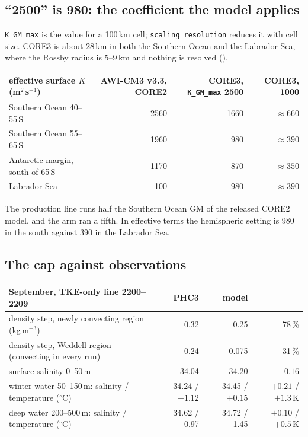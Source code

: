\documentclass[10pt]{article}
\begin{document}
\subsection{``2500'' is 980: the coefficient the model applies}\label{sub:r51keff}

\texttt{K\_GM\_max} is the value for a 100\,km cell; \texttt{scaling\_resolution} reduces it with
cell size. CORE3 is about 28\,km in both the Southern Ocean and the Labrador Sea, where the Rossby
radius is 5--9\,km and nothing is resolved ().

\begin{center}\small
\begin{tabular}{lrrr}
\toprule
effective surface $K$ (m$^2$\,s$^{-1}$) & AWI-CM3 v3.3, CORE2 & CORE3, \texttt{K\_GM\_max} 2500 & CORE3, 1000 \\
\midrule
Southern Ocean 40--55\,S & 2560 & 1660 & $\approx660$ \\
Southern Ocean 55--65\,S & 1960 & 980 & $\approx390$ \\
Antarctic margin, south of 65\,S & 1170 & 870 & $\approx350$ \\
Labrador Sea & 100 & 980 & $\approx390$ \\
\bottomrule
\end{tabular}
\end{center}

The production line runs half the Southern Ocean GM of the released CORE2 model, and the arm ran a
fifth. In effective terms the hemispheric setting is 980 in the south against 390 in the Labrador
Sea.

\subsection{The cap against observations}\label{sub:r51phc}

\begin{center}\small
\begin{tabular}{lrrr}
\toprule
September, TKE-only line 2200--2209 & PHC3 & model & \\
\midrule
density step, newly convecting region (kg\,m$^{-3}$) & 0.32 & 0.25 & 78\,\% \\
density step, Weddell region (convecting in every run) & 0.24 & 0.075 & 31\,\% \\
surface salinity 0--50\,m & 34.04 & 34.20 & $+0.16$ \\
winter water 50--150\,m: salinity / temperature ($^\circ$C) & 34.24 / $-1.12$ & 34.45 / $+0.15$ & $+0.21$ / $+1.3$\,K \\
deep water 200--500\,m: salinity / temperature ($^\circ$C) & 34.62 / 0.97 & 34.72 / 1.45 & $+0.10$ / $+0.5$\,K \\
\bottomrule
\end{tabular}
\end{center}
\end{document}

